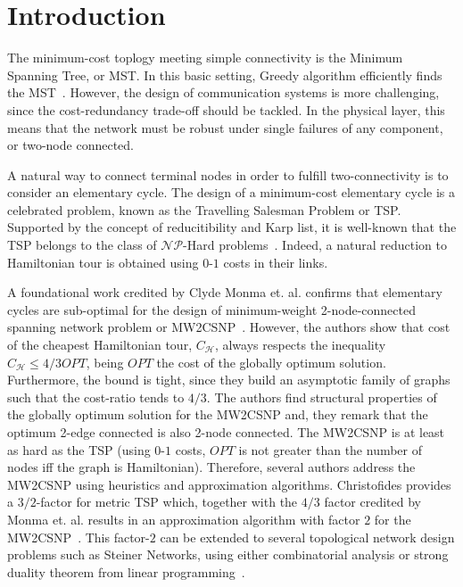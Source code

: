 \documentclass{endm}
\begin{document}
\section{Introduction}\label{intro}
The minimum-cost toplogy meeting simple connectivity is the Minimum Spanning Tree, or MST. In this basic setting, Greedy algorithm efficiently finds the MST~\cite{Kruskal}.
However, the design of communication systems is more challenging, since the cost-redundancy trade-off should be tackled.
In the physical layer, this means that the network must be robust under single failures of any component, or two-node connected.

A natural way to connect terminal nodes in order to fulfill two-connectivity is to consider an elementary cycle. The design of a minimum-cost
elementary cycle is a celebrated problem, known as the Travelling Salesman Problem or TSP. Supported by the concept of reducitibility
and Karp list, it is well-known that the TSP belongs to the class of $\mathcal{NP}$-Hard problems~\cite{Karp72}.
Indeed, a natural reduction to Hamiltonian tour is obtained using $0$-$1$ costs in their links.

A foundational work credited by Clyde Monma et. al. confirms that elementary cycles are sub-optimal for the design of
minimum-weight 2-node-connected spanning network problem or MW2CSNP~\cite{monma1990minimum}.
However, the authors show that cost of the cheapest Hamiltonian tour, $C_{\mathcal{H}}$, always respects the inequality
$C_{\mathcal{H}} \leq 4/3 OPT$, being $OPT$ the cost of the globally optimum solution.
Furthermore, the bound is tight, since they build an asymptotic family of graphs such that the cost-ratio tends to $4/3$. The authors find structural properties of the globally optimum
solution for the MW2CSNP and, they remark that the optimum 2-edge connected is also
2-node connected. The MW2CSNP is at least as hard as the TSP (using $0$-$1$ costs, $OPT$ is not greater than the number of nodes
iff the graph is Hamiltonian). Therefore, several authors address the MW2CSNP using heuristics and approximation algorithms.
Christofides provides a $3/2$-factor for metric TSP which, together with the $4/3$ factor credited by
Monma et. al. results in an approximation algorithm with factor $2$ for the MW2CSNP~\cite{christofides}. This factor-$2$ can be extended to
several topological network design problems such as Steiner Networks, using either combinatorial analysis or strong duality
theorem from linear programming~\cite{vazirani2003approximation,GW}.
\end{document}
